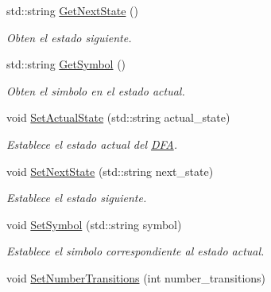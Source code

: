 \begin{DoxyCompactItemize}
std\+::string \hyperlink{classTransition_a3ffdd67d98d0c6158c73b691f10e4392}{Get\+Next\+State} ()
\begin{DoxyCompactList}\small\item\em Obten el estado siguiente. \end{DoxyCompactList}\item 
\mbox{\label{classTransition_a21056331ad32e3f32370127c6cf4be24}} 
std\+::string \hyperlink{classTransition_a21056331ad32e3f32370127c6cf4be24}{Get\+Symbol} ()
\begin{DoxyCompactList}\small\item\em Obten el simbolo en el estado actual. \end{DoxyCompactList}\item 
\mbox{\label{classTransition_a7885360c211f7f35ff72f9a3b868aa35}} 
void \hyperlink{classTransition_a7885360c211f7f35ff72f9a3b868aa35}{Set\+Actual\+State} (std\+::string actual\+\_\+state)
\begin{DoxyCompactList}\small\item\em Establece el estado actual del \hyperlink{classDFA}{D\+FA}. \end{DoxyCompactList}\item 
\mbox{\label{classTransition_ae5d10fa5a007a2315b5ded4515ff88f0}} 
void \hyperlink{classTransition_ae5d10fa5a007a2315b5ded4515ff88f0}{Set\+Next\+State} (std\+::string next\+\_\+state)
\begin{DoxyCompactList}\small\item\em Establece el estado siguiente. \end{DoxyCompactList}\item 
\mbox{\label{classTransition_a0040651c4cc7205f51158d2c5c8bab16}} 
void \hyperlink{classTransition_a0040651c4cc7205f51158d2c5c8bab16}{Set\+Symbol} (std\+::string symbol)
\begin{DoxyCompactList}\small\item\em Establece el simbolo correspondiente al estado actual. \end{DoxyCompactList}\item 
\mbox{\label{classTransition_ab7bee49e1cdf54cf7dd5f82c3fbeb93f}} 
void \hyperlink{classTransition_ab7bee49e1cdf54cf7dd5f82c3fbeb93f}{Set\+Number\+Transitions} (int number\+\_\+transitions)

\end{DoxyCompactItemize}
